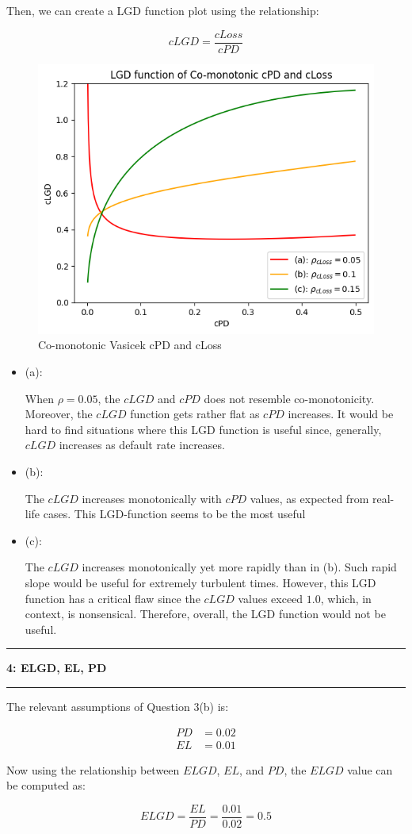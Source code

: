 \documentclass[11pt]{article}
\newcommand\question[2]{\vspace{.25in}\hrule\textbf{#1: #2}\vspace{.5em}\hrule\vspace{.10in}}
\begin{document}
Then, we can create a LGD function plot using the relationship:

$$
cLGD = \frac{cLoss}{cPD}
$$

\begin{figure}[h]
\centering
\includegraphics[scale=0.8]{Q3.png}
\caption{Co-monotonic Vasicek cPD and cLoss}
\label{Fig:Q1}
\end{figure}

\begin{itemize}

\item (a):

When $\rho = 0.05$, the $cLGD$ and $cPD$ does not resemble
co-monotonicity. Moreover, the $cLGD$ function gets rather 
flat as $cPD$ increases. It would be hard to find situations
where this LGD function is useful since, generally, $cLGD$ 
increases as default rate increases.

\item (b):

The $cLGD$ increases monotonically with $cPD$ values, as 
expected from real-life cases. This LGD-function seems to
be the most useful

\newpage

\item (c):

The $cLGD$ increases monotonically yet more rapidly than
in (b). Such rapid slope would be useful for extremely 
turbulent times. However, this LGD function has a critical 
flaw since the $cLGD$ values exceed $1.0$, which, in context, 
is nonsensical. Therefore, overall, the LGD function would 
not be useful.

\end{itemize}


\question{4}{ELGD, EL, PD}

The relevant assumptions of Question 3(b) is:

$$
\begin{aligned}
PD &= 0.02 \\
EL &= 0.01
\end{aligned}
$$

Now using the relationship between $ELGD$, $EL$, and $PD$,
the $ELGD$ value can be computed as:

$$
ELGD = \frac{EL}{PD} = \frac{0.01}{0.02} = 0.5
$$
\end{document}
